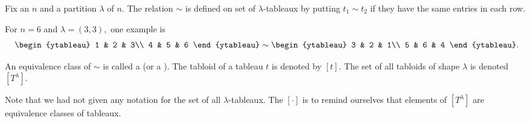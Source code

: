 \begin{defn}%
	Fix an $n$ and a partition $\lambda$ of $n.$ The relation $\sim$ is defined on set of $\lambda$-tableaux by putting $t_1 \sim t_2$ if they have the same entries in each row.
\end{defn}
\begin{ex}
	For $n = 6$ and $\lambda = (3, 3),$ one example is
	\begin{equation*} 
		\begin{ytableau}
			1 & 2 & 3\\
			4 & 5 & 6
		\end{ytableau} \sim 
		\begin{ytableau}
			3 & 2 & 1\\
			5 & 6 & 4
		\end{ytableau}.
	\end{equation*}
\end{ex}

\begin{defn}%
	An equivalence class of $\sim$ is called a  (or a ). The tabloid of a tableau $t$ is denoted by $[t].$ The set of all tabloids of shape $\lambda$ is denoted $[T^\lambda].$
\end{defn}
Note that we had not given any notation for the set of all $\lambda$-tableaux. The $[\cdot]$ is to remind ourselves that elements of $[T^\lambda]$ are equivalence classes of tableaux.

